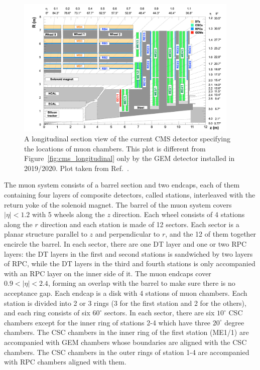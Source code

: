 \begin{figure}[!htb]
    \centering
    \captionsetup{justification=justified}
    \includegraphics[width=0.95\textwidth]{pics/LHC_CMS/muon_chambers.png}
    \caption{A longitudinal section view of the current CMS detector specifying the locations of muon chambers.
             This plot is different from Figure~\ref{fig:cms_longitudinal} only by the GEM detector installed in 2019/2020.
             Plot taken from Ref.~\cite{Colaleo:2021453}.}
    \label{fig:cms_muons}
\end{figure}


The muon system consists of a barrel section and two endcaps, each of them containing four layers of composite detectors, 
called stations, interleaved with the return yoke of the solenoid magnet.
The barrel of the muon system covers $|\eta| < 1.2$ with 5 wheels along the $z$ direction.
Each wheel consists of 4 stations along the $r$ direction and each station is made of 12 sectors.
Each sector is a planar structure parallel to $z$ and perpendicular to $r$, 
and the 12 of them together encircle the barrel.
In each sector, there are one DT layer and one or two RPC layers: the DT layers in the first and second stations is sandwiched by two layers of RPC,
while the DT layers in the third and fourth stations is only accompanied with an RPC layer on the inner side of it.
The muon endcaps cover $0.9 < |\eta| < 2.4$, forming an overlap with the barrel to make sure there is no acceptance gap.
Each endcap is a disk with 4 stations of muon chambers.
Each station is divided into 2 or 3 rings (3 for the first station and 2 for the others), and each ring consists of six $60^\circ$ sectors.
In each sector, there are six $10^\circ$ CSC chambers except for the inner ring of stations 2-4 which have three $20^\circ$ degree chambers.
The CSC chambers in the inner ring of the first station (ME1/1) are accompanied with GEM chambers whose boundaries are aligned with the CSC chambers.
The CSC chambers in the outer rings of station 1-4 are accompanied with RPC chambers aligned with them.

